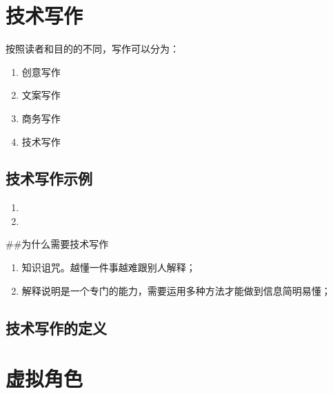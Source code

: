 \documentclass[letterpaper,10pt,english]{sphinxmanual}
\begin{document}
\chapter{技术写作}
\label{\detokenize{introduction/tw:id1}}\label{\detokenize{introduction/tw::doc}}
\sphinxAtStartPar
按照读者和目的的不同，写作可以分为：
\begin{enumerate}
%
\item {} 
\sphinxAtStartPar
创意写作

\item {} 
\sphinxAtStartPar
文案写作

\item {} 
\sphinxAtStartPar
商务写作

\item {} 
\sphinxAtStartPar
技术写作

\end{enumerate}


\section{技术写作示例}
\label{\detokenize{introduction/tw:id2}}\begin{enumerate}
%
\item {} 
\sphinxAtStartPar
{}

\item {} 
\sphinxAtStartPar
{}

\end{enumerate}

\sphinxAtStartPar
\#\#为什么需要技术写作
\begin{enumerate}
%
\item {} 
\sphinxAtStartPar
知识诅咒。越懂一件事越难跟别人解释；

\item {} 
\sphinxAtStartPar
解释说明是一个专门的能力，需要运用多种方法才能做到信息简明易懂；

\end{enumerate}


\section{技术写作的定义}
\label{\detokenize{introduction/tw:id3}}
\sphinxstepscope


\chapter{虚拟角色}
\label{\detokenize{user-research/persona:id1}}\label{\detokenize{user-research/persona::doc}}
\end{document}
